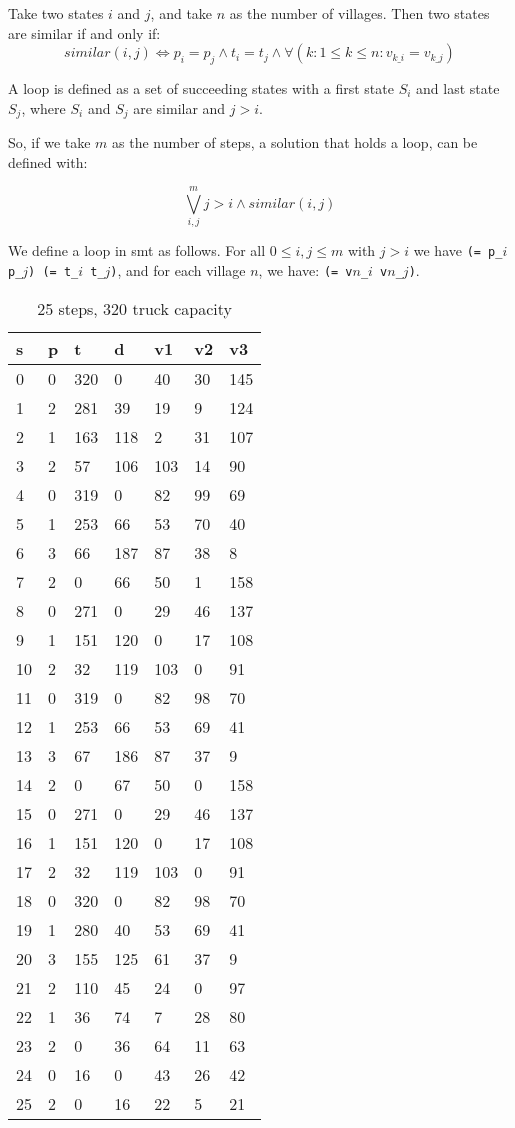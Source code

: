 \documentclass[a4paper]{article}
\begin{document}
	Take two states $i$ and $j$, and take $n$ as the number of villages. Then two states are similar if and only if:
	$$similar(i, j) \Leftrightarrow p_i = p_j \wedge t_i = t_j \wedge \forall (k: 1 \leq k \leq n : v_{k\_i} = v_{k\_j})$$
	
	A loop is defined as a set of succeeding states with a first state $S_i$ and last state $S_j$, where $S_i$ and $S_j$ are similar and $j > i$.
	
	So, if we take $m$ as the number of steps, a solution that holds a loop, can be defined with:
	
	$$\bigvee_{i, j}^m j > i \wedge similar(i, j)$$
	
	We define a loop in smt as follows. For all $0 \leq i, j \leq m$ with $j > i$ we have {\tt (= p\_$i$ p\_$j$) (= t\_$i$ t\_$j$)}, and for each village $n$, we have: {\tt (= v$n$\_$i$ v$n$\_$j$)}.
	
	\begin{table}[!htb]
		\begin{longtable}[c]{@{}|l|l|l|l|l|l|l|@{}}
			\toprule
			s & p & t & d & v1 & v2 & v3\tabularnewline
			\midrule
			\endhead
			0 & 0 & 320 & 0 & 40 & 30 & 145\tabularnewline
			1 & 2 & 281 & 39 & 19 & 9 & 124\tabularnewline
			2 & 1 & 163 & 118 & 2 & 31 & 107\tabularnewline
			3 & 2 & 57 & 106 & 103 & 14 & 90\tabularnewline
			4 & 0 & 319 & 0 & 82 & 99 & 69\tabularnewline
			5 & 1 & 253 & 66 & 53 & 70 & 40\tabularnewline
			6 & 3 & 66 & 187 & 87 & 38 & 8\tabularnewline
			7 & 2 & 0 & 66 & 50 & 1 & 158\tabularnewline
			\rowcolor{Highlight}
			8 & 0 & 271 & 0 & 29 & 46 & 137\tabularnewline
			9 & 1 & 151 & 120 & 0 & 17 & 108\tabularnewline
			10 & 2 & 32 & 119 & 103 & 0 & 91\tabularnewline
			11 & 0 & 319 & 0 & 82 & 98 & 70\tabularnewline
			12 & 1 & 253 & 66 & 53 & 69 & 41\tabularnewline
			13 & 3 & 67 & 186 & 87 & 37 & 9\tabularnewline
			14 & 2 & 0 & 67 & 50 & 0 & 158\tabularnewline
			\rowcolor{Highlight}
			15 & 0 & 271 & 0 & 29 & 46 & 137\tabularnewline
			16 & 1 & 151 & 120 & 0 & 17 & 108\tabularnewline
			17 & 2 & 32 & 119 & 103 & 0 & 91\tabularnewline
			18 & 0 & 320 & 0 & 82 & 98 & 70\tabularnewline
			19 & 1 & 280 & 40 & 53 & 69 & 41\tabularnewline
			20 & 3 & 155 & 125 & 61 & 37 & 9\tabularnewline
			21 & 2 & 110 & 45 & 24 & 0 & 97\tabularnewline
			22 & 1 & 36 & 74 & 7 & 28 & 80\tabularnewline
			23 & 2 & 0 & 36 & 64 & 11 & 63\tabularnewline
			24 & 0 & 16 & 0 & 43 & 26 & 42\tabularnewline
			25 & 2 & 0 & 16 & 22 & 5 & 21\tabularnewline
			\bottomrule
		\end{longtable}
		\caption{25 steps, 320 truck capacity}
		\label{tab:1b}
	\end{table}
	
\end{document}
